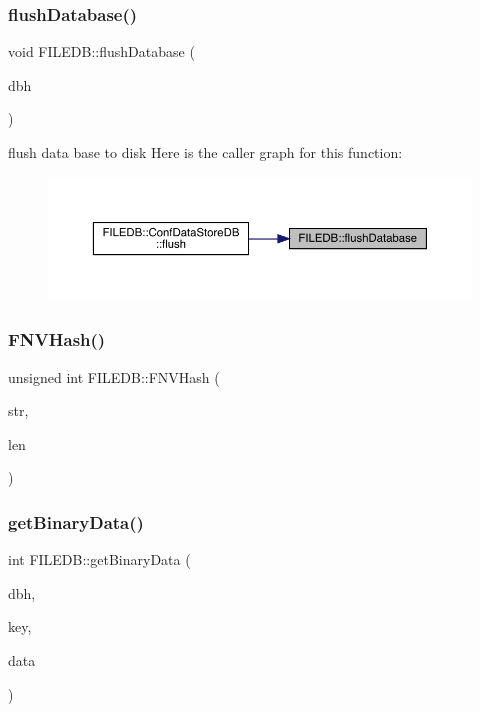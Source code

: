 \subsubsection{\texorpdfstring{flushDatabase()}{flushDatabase()}}
{\footnotesize\ttfamily void F\+I\+L\+E\+D\+B\+::flush\+Database (\begin{DoxyParamCaption}\item[{\mbox{\hyperlink{other__libs_2filedb_2filehash_2ffdb__db_8h_a0b27b956926453a7a8141ea8e10f0df8}{F\+F\+D\+B\+\_\+\+DB}} $\ast$}]{dbh }\end{DoxyParamCaption})}

flush data base to disk Here is the caller graph for this function\+:\nopagebreak
\begin{figure}[H]
\begin{center}
\leavevmode
\includegraphics[width=350pt]{d2/de6/namespaceFILEDB_a28e01191edebd63edee882e8c7af9325_icgraph}
\end{center}
\end{figure}
\mbox{\label{namespaceFILEDB_ab7ad322a4b472713751d23b4b6495ddf}} 
\subsubsection{\texorpdfstring{FNVHash()}{FNVHash()}}
{\footnotesize\ttfamily unsigned int F\+I\+L\+E\+D\+B\+::\+F\+N\+V\+Hash (\begin{DoxyParamCaption}\item[{char $\ast$}]{str,  }\item[{unsigned int}]{len }\end{DoxyParamCaption})}

\mbox{\label{namespaceFILEDB_a0de8699301294566d0e11786f4016a2a}} 
\subsubsection{\texorpdfstring{getBinaryData()}{getBinaryData()}}
{\footnotesize\ttfamily int F\+I\+L\+E\+D\+B\+::get\+Binary\+Data (\begin{DoxyParamCaption}\item[{\mbox{\hyperlink{other__libs_2filedb_2filehash_2ffdb__db_8h_a0b27b956926453a7a8141ea8e10f0df8}{F\+F\+D\+B\+\_\+\+DB}} $\ast$}]{dbh,  }\item[{const std\+::string \&}]{key,  }\item[{std\+::string \&}]{data }\end{DoxyParamCaption})}

